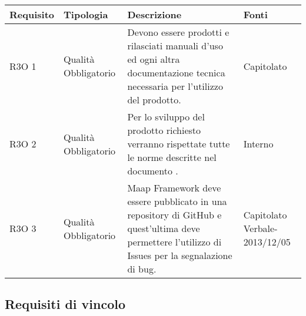       \begin{center}
      \bgroup
      \def\arraystretch{1.8}
      \begin{longtable}{ | l | p{2cm} | p{5cm} | p{1.7cm} |}
    
      \cellcolor[gray]{0.9} \textbf{Requisito} & \cellcolor[gray]{0.9} \textbf{Tipologia} 
      & \cellcolor[gray]{0.9} \textbf{Descrizione} & \cellcolor[gray]{0.9} \textbf{Fonti} \\ \hline
      
        R3O 1 & Qualità \newline  Obbligatorio  & Devono essere prodotti e rilasciati manuali d'uso ed ogni altra documentazione tecnica necessaria per l’utilizzo del prodotto. &  Capitolato \newline  \\ \hline      
        R3O 2 & Qualità \newline  Obbligatorio  & Per lo sviluppo del prodotto richiesto verranno rispettate tutte le norme descritte nel documento \NormeDiProgetto{}. &  Interno \newline  \\ \hline      
        R3O 3 & Qualità \newline  Obbligatorio  & Maap Framework deve essere pubblicato in una repository di GitHub e quest'ultima deve permettere l'utilizzo di Issues per la segnalazione di bug. &  Capitolato \newline  Verbale-2013/12/05 \newline  \\ \hline
      \end{longtable}
      \egroup
      \end{center}  
\clearpage

\subsection{Requisiti di vincolo }

